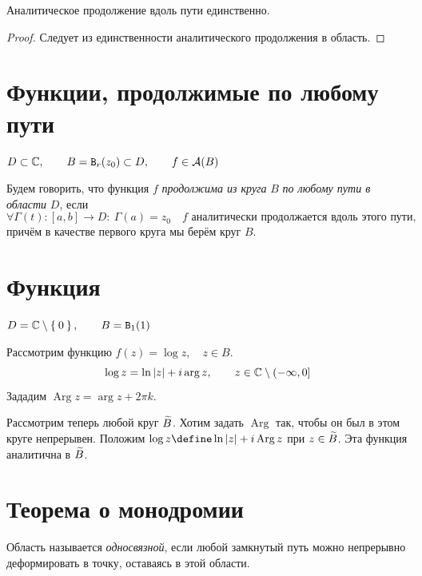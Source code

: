 \begin{theorem}
	Аналитическое продолжение вдоль пути единственно.
\end{theorem}

\begin{proof}
	Следует из единственности аналитического продолжения в область.
\end{proof}

\section{Функции, продолжимые по любому пути}

\begin{definition}
	$ D \subset \mathbb{C}, \qquad B = \mathtt B_r(z_0) \subset D, \qquad f \in \mathcal A(B) $

	Будем говорить, что функция $ f $ \emph{продолжима из круга} $ B $ \emph{по любому пути в области} $ D $, если
	$$ \forall \Gamma(t) : [a, b] \to D : ~ \Gamma(a) = z_0 \quad f \text{ аналитически продолжается вдоль этого пути}, $$
	причём в качестве первого круга мы берём круг $ B $.
\end{definition}

\section{Функция }

\begin{eg}
	$ D = \mathbb{C} \setminus \Set0, \qquad B = \mathtt B_1(1) $

	Рассмотрим функцию $ f(z) = \log z, \quad z \in B $.
	$$ \log z = \ln |z| + i \operatorname{arg} z, \qquad z \in \mathbb{C} \setminus (-\infty, 0] $$
	Зададим $ \operatorname{Arg} z = \operatorname{arg} z + 2\pi k $.

	Рассмотрим теперь любой круг $ \widetilde B $.
	Хотим задать $ \operatorname{Arg} $ так, чтобы он был в этом круге непрерывен.
	Положим $ \log z \define \ln |z| + i \operatorname{Arg} z $ при $ z \in \widetilde B $.
	Эта функция аналитична в $ \widetilde B $.
\end{eg}

\section{Теорема о монодромии}

\begin{definition}
	Область называется \emph{односвязной}, если любой замкнутый путь можно непрерывно деформировать в точку, оставаясь в этой области.
\end{definition}

